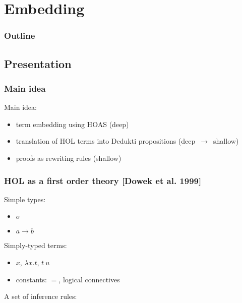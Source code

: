\section{Embedding}

\begin{frame}
\frametitle{Outline}

\tableofcontents[currentsection]
\end{frame}


\subsection{Presentation}

\begin{frame}
\frametitle{Main idea}

\begin{block}{Main idea:}
  \begin{itemize}
  \item term embedding using HOAS (deep)
  \item translation of HOL terms into Dedukti propositions
    (deep~$\to$~shallow)
  \item proofs as rewriting rules (shallow)
  \end{itemize}
\end{block}

\end{frame}


\begin{frame}
\frametitle{HOL as a first order theory [Dowek et al. 1999]}

Simple types:
\begin{itemize}
\item $o$
\item $a \to b$
\end{itemize}

\vspace{0.5cm}

Simply-typed terms:
\begin{itemize}
\item $x$, $\lambda x.t$, $t\ u$
\item constants: $=$, logical connectives
\end{itemize}

\vspace{0.5cm}

A set of inference rules:
\begin{mathpar}

\end{mathpar}

\end{frame}


